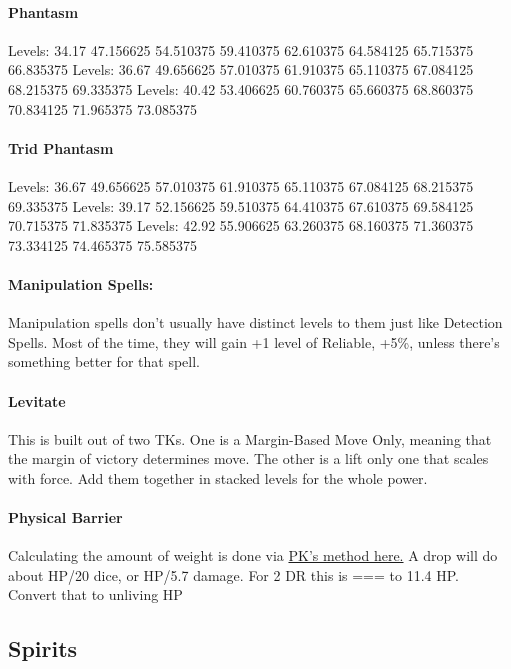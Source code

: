 \begin{multicols*}{2}
	\paragraph{Phantasm}
	Levels: 34.17 47.156625 54.510375 59.410375 62.610375 64.584125 65.715375 66.835375
	Levels: 36.67 49.656625 57.010375 61.910375 65.110375 67.084125 68.215375 69.335375
	Levels: 40.42 53.406625 60.760375 65.660375 68.860375 70.834125 71.965375 73.085375
	
	\paragraph{Trid Phantasm}
	Levels: 36.67 49.656625 57.010375 61.910375 65.110375 67.084125 68.215375 69.335375
	Levels: 39.17 52.156625 59.510375 64.410375 67.610375 69.584125 70.715375 71.835375
	Levels: 42.92 55.906625 63.260375 68.160375 71.360375 73.334125 74.465375 75.585375
	
	\paragraph{Manipulation Spells:}
	
	Manipulation spells don't usually have distinct levels to them just like Detection Spells. Most of the time, they will gain +1 level of Reliable, +5\%, unless there's something better for that spell.
	
	\paragraph{Levitate}
	This is built out of two TKs. One is a Margin-Based Move Only, meaning that the margin of victory determines move. The other is a lift only one that scales with force. Add them together in stacked levels for the whole power.
	
	\paragraph{Physical Barrier}
	
	Calculating the amount of weight is done via \href{https://forums.sjgames.com/showpost.php?p=1936968&postcount=10}{PK's method here.}  A drop will do about HP/20 dice, or HP/5.7 damage. For 2 DR this is  === to 11.4 HP. Convert that to unliving HP
	
	\subsection{Spirits}
	

\end{multicols*}
